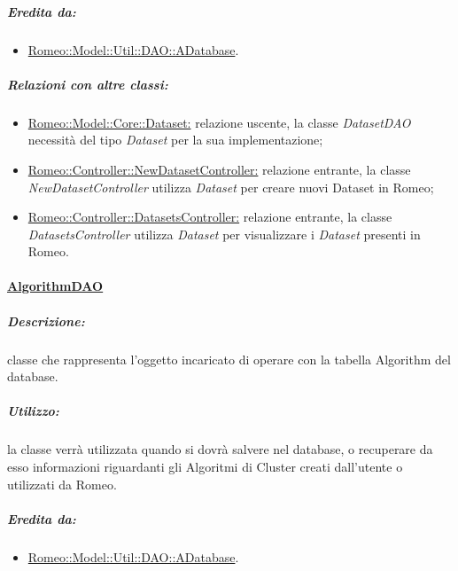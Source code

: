 			\subparagraph{Eredita da:}
			\begin{itemize}
				\item \hyperref[romeo::model::util::dao]{Romeo::Model::Util::DAO::ADatabase}.			
			\end{itemize}
			
			\subparagraph{Relazioni con altre classi:}
				\begin{itemize}
					
					\item \hyperref[]{Romeo::Model::Core::Dataset:} relazione uscente, la classe \textsl{DatasetDAO} necessità del tipo \textsl{Dataset} per la sua implementazione;
											
					\item \hyperref[]{Romeo::Controller::NewDatasetController:} relazione entrante, la classe \textsl{NewDatasetController} utilizza \textsl{Dataset} per creare nuovi Dataset\g{} in Romeo\g{};
											
					\item \hyperref[]{Romeo::Controller::DatasetsController:} relazione entrante, la classe \textsl{DatasetsController} utilizza \textsl{Dataset} per visualizzare i \textsl{Dataset} presenti in Romeo\g{}.
				\end{itemize}
		
		\paragraph{\underline{AlgorithmDAO}}
		\label{dao::algorithmdao}
				\subparagraph{Descrizione:}  classe che rappresenta l’oggetto incaricato di operare con la tabella Algorithm del database.
				
				\subparagraph{Utilizzo:} la classe verrà utilizzata quando si dovrà salvere nel database, o recuperare da esso informazioni riguardanti gli Algoritmi di Cluster\g{} creati dall'utente o utilizzati da Romeo\g{}.		
								
				\subparagraph{Eredita da:}
				\begin{itemize}
					\item \hyperref[romeo::model::util::dao]{Romeo::Model::Util::DAO::ADatabase}.			
				\end{itemize}
				
